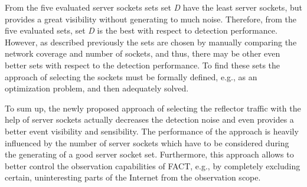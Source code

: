 From the five evaluated \glspl{server socket} sets set \emph{D} have the least \glspl{server socket}, but provides a great visibility without generating to much noise.
Therefore, from the five evaluated sets, set \emph{D} is the best with respect to detection performance. 
However, as described previously the sets are chosen by manually comparing the network coverage and number of sockets, and thus, there may be other even better sets with respect to the detection performance. 
To find these sets the approach of selecting the sockets must be formally defined, e.g., as an optimization problem, and then adequately solved.

To sum up, the newly proposed approach of selecting the reflector traffic with the help of \glspl{server socket} actually decreases the detection noise and even provides a better event visibility and sensibility.
The performance of the approach is heavily influenced by the number of \glspl{server socket} which have to be considered during the generating of a good \gls{server socket} set.
Furthermore, this approach allows to better control the observation capabilities of \gls{FACT}, e.g., by completely excluding certain, uninteresting parts of the Internet from the observation scope.